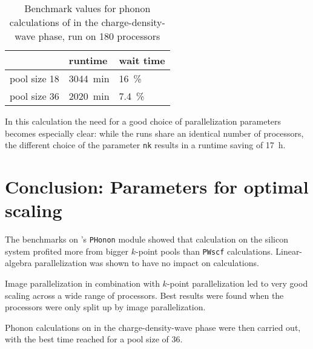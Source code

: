 \documentclass[main.tex]{subfiles}
\begin{document}
\begin{table}
    \caption{Benchmark values for phonon calculations of \TaS in the charge-density-wave phase, run on 180 processors}
    \begin{tabular}{@{}lll@{}}
    \toprule
                 & runtime            & wait time \\ \midrule
    pool size 18 & \SI{3044}{\minute} & \SI{16}{\percent}         \\
    pool size 36 & \SI{2020}{\minute} & \SI{7.4}{\percent}
    \end{tabular}
    \label{tab:tas2_cdw_phonon_times}
\end{table}
In this calculation the need for a good choice of parallelization parameters becomes especially clear:
while the runs share an identical number of processors, the different choice of the parameter \texttt{nk} results in a runtime saving of \SI{17}{\hour}.

\section{Conclusion: Parameters for optimal scaling}

The benchmarks on \QE's \texttt{PHonon} module showed that calculation on the silicon system profited more from bigger \(k\)-point pools than \texttt{PWscf} calculations.
Linear-algebra parallelization was shown to have no impact on calculations.

Image parallelization in combination with \(k\)-point parallelization led to very good scaling across a wide range of processors.
Best results were found when the processors were only split up by image parallelization.

Phonon calculations on \TaS in the charge-density-wave phase were then carried out, with the best time reached for a pool size of 36.
\end{document}
